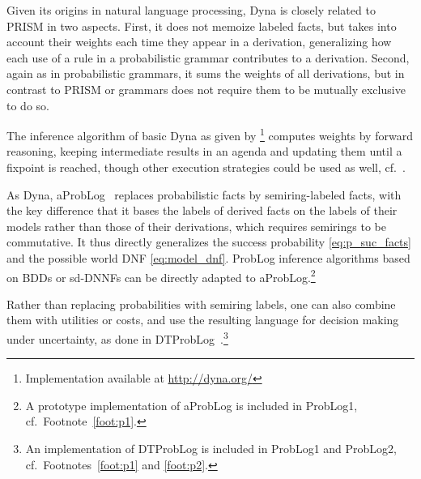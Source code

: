 \documentclass[a4paper]{article}
\begin{document}
Given its origins in natural language processing, Dyna is closely related to PRISM in two aspects. First, it does not memoize labeled
facts, but takes into account their weights each time they appear in a
derivation, generalizing how each use of a rule in a probabilistic
grammar contributes to a derivation. Second, again as in probabilistic
grammars, it sums the weights of all derivations, but in contrast to
PRISM or grammars does not require them to be mutually exclusive to do
so.

 The inference algorithm of basic Dyna as given by
 \cite{Eisner05}\footnote{Implementation available at \url{http://dyna.org/}}
computes weights by forward reasoning, keeping intermediate results in
an agenda and updating them until a fixpoint is reached, though other
execution strategies could be used as well,
cf.~\citep{eisner-filardo-2011}. 

As Dyna, aProbLog~\citep{kimmig:aaai11} replaces probabilistic facts
by semiring-labeled facts, with the key difference that it bases the
labels of derived facts on the labels of their models rather than
those of their derivations, which requires semirings to be commutative. It thus directly generalizes the success
probability \eqref{eq:p_suc_facts} and the possible world DNF
\eqref{eq:model_dnf}. ProbLog inference algorithms based on BDDs or
sd-DNNFs can be directly adapted to aProbLog.\footnote{A prototype implementation of aProbLog
  is included in ProbLog1, cf.~Footnote~\ref{foot:p1}.}

Rather than replacing probabilities with semiring labels, one can
also combine them with utilities or costs, and use the resulting
language for decision making under uncertainty, as done in
DTProbLog~\citep{vandenbroeck:aaai10}.\footnote{An
  implementation of DTProbLog is included in ProbLog1 and ProbLog2,
  cf.~Footnotes~\ref{foot:p1} and \ref{foot:p2}.}
\end{document}
